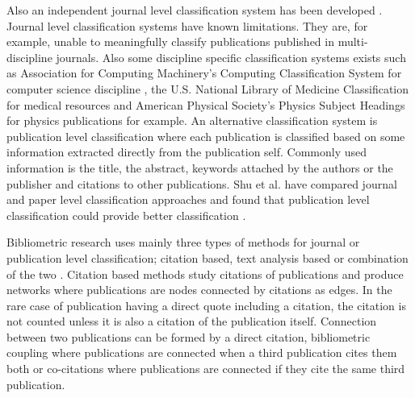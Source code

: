 Also an independent journal level classification system has been 
developed \cite{archambault_towards_2011}.
Journal level classification systems have known limitations.
They are, for example, unable to meaningfully classify
publications published in multi-discipline journals.
Also some discipline specific classification systems exists such 
as Association for Computing Machinery's Computing Classification 
System for computer science discipline \cite{noauthor_2012_2020}, 
the U.S. National Library
of Medicine Classification \cite{noauthor_national_2020} for medical 
resources and American Physical Society's Physics Subject Headings
\cite{noauthor_american_2020} for physics publications for example.
An alternative classification system is publication level 
classification where each publication is classified based on some 
information extracted directly from the publication self. Commonly 
used information is the title, the abstract, keywords attached by
the authors or the publisher and citations to other publications.
Shu et al. have compared journal and paper level classification
approaches and found that publication level classification could
provide better classification \cite{shu_comparing_2019}.

Bibliometric research uses mainly three types of methods for 
journal or publication level classification; citation 
based, text analysis based or combination of the two 
\cite{janssens_hybrid_2009}. Citation based methods study 
citations of publications and produce networks where publications 
are nodes connected by citations as edges. In the rare case of 
publication having a direct quote including a citation, the 
citation is not counted unless it is also a citation of the 
publication itself. Connection between two publications can be 
formed by a direct citation, bibliometric coupling where 
publications are connected when a third publication cites them 
both or co-citations where publications are connected if they 
cite the same third publication.

